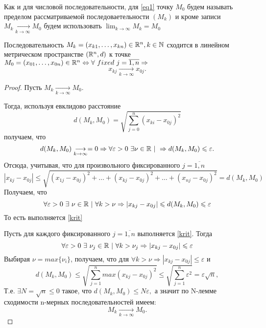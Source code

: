 \documentclass[../../main.tex]{subfiles}
\begin{document}
	Как и для числовой последовательности, для \eqref{eq1} точку $M_0$ будем называть пределом рассматриваемой последоваетельности $(M_k)$ и кроме записи $M_k \underset{k\rightarrow\infty}{\longrightarrow}  M_0$ будем использовать $ \lim_{k \to \infty}{M_k} = M_0$
	\begin{thm}
		Последовательность $M_k = (x_{k1}, \dots, x_{kn}) \in \mathbb{R}^n, k \in \mathbb{N}$ сходится в линейном метрическом пространстве $(\mathbb{R}^n, d)$ к точке $M_0 = (x_{01}, \dots, x_{0n}) \in \mathbb{R}^n \Leftrightarrow \forall\ fixed\ j = \overline{1, n} \Rightarrow$
		\begin{equation}
		\label{krit}
			x_{kj}\underset{k\rightarrow\infty}{\longrightarrow} x_{0j}.
		\end{equation}
	\end{thm}
	\begin{proof}
		
		\nec 
		Пусть $M_k \underset{k\rightarrow\infty}{\longrightarrow}  M_0$.
		
		Тогда, используя евклидово расстояние 
		\[
			d(M_k, M_0) = \sqrt{\sum_{j = 0}^{n}{(x_{ki} - x_{0j})^2}}
		\]
		получаем, что
		\[
			d(M_k, M_0) \underset{k\rightarrow\infty}{\longrightarrow} = 0 \Rightarrow
			\forall \varepsilon > 0\ \exists \nu \in \R\ |\ \Rightarrow d(M_k, M_0) \leqslant \varepsilon.
		\]
		Отсюда, учитывая, что для произвольного фиксированного $j = \overline{1, n}$
		\[
			|x_{kj} - x_{0j}| \leqslant \sqrt{(x_{1j} - x_{0j})^2 + \dots + (x_{kj} - x_{0j})^2 + \dots + (x_{nj} - x_{0j})^2} = d(M_k, M_0) 
		\]
		Получаем, что 
		\[
			\forall \varepsilon > 0\ \exists\ \nu \in \R\ |\ \forall k > \nu \Rightarrow |x_{kj} - x_{0j}| \leqslant d(M_k, M_0) \leqslant \varepsilon
		\]
		То есть выполняется \eqref{krit}
		
		\suff Пусть для каждого фиксированного $j = \overline{1, n}$ выполняется \eqref{krit}. Тогда
		\[
			\forall \varepsilon > 0\ \exists\ \nu_j \in \mathbb{R}\ |\ \forall k > \nu_j \Rightarrow |x_{kj} - x_{0j}| \leqslant \varepsilon
		\]
		Выбирая $\nu = max\{\nu_i\}$, получаем, что для $\forall k > \nu \Rightarrow |x_{kj} - x_{0j}| \leqslant \varepsilon$
		 и 
		 \[
		 	d(M_k, M_0) \leqslant \sqrt{\sum_{j = 1}^{n}{max(x_{kj} - x_{0j})^2}} \leqslant \sqrt{\sum_{j = 1}^{n}{\varepsilon^2}} = \varepsilon\sqrt{n}, 
		 \]
		 Т.е. $\exists N = \sqrt{n} \leqslant 0$ такое, что $d(M_k, M_0) \leqslant N \varepsilon,$ а значит по N-лемме сходимости n-мерных последовательностей имеем:
		 \[
		 	M_k \underset{k\rightarrow\infty}{\longrightarrow}  M_0.
		 \]
	\end{proof}
\end{document}
